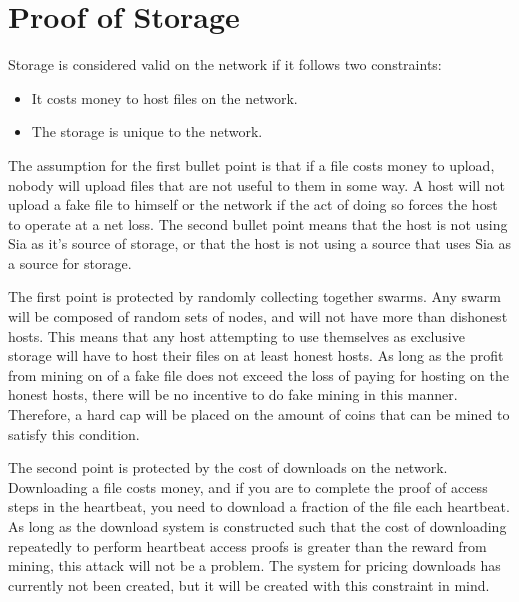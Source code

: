 \documentclass[twocolumn]{article}
\begin{document}
\section{Proof of Storage}

Storage is considered valid on the network if it follows two constraints:

\begin{itemize}
	\item It costs money to host files on the network.
	\item The storage is unique to the network.
\end{itemize}

The assumption for the first bullet point is that if a file costs money to upload, nobody will upload files that are not useful to them in some way.
A host will not upload a fake file to himself or the network if the act of doing so forces the host to operate at a net loss.
The second bullet point means that the host is not using Sia as it's source of storage, or that the host is not using a source that uses Sia as a source for storage.

The first point is protected by randomly collecting together swarms.
Any swarm will be composed of random sets of nodes, and will not have more than \maxcorruption \space dishonest hosts.
This means that any host attempting to use themselves as exclusive storage will have to host their files on at least \inversemaxcorruption \space honest hosts.
As long as the profit from mining on \maxcorruption \space of a fake file does not exceed the loss of paying for hosting on the \inversemaxcorruption honest hosts, there will be no incentive to do fake mining in this manner.
Therefore, a hard cap will be placed on the amount of coins that can be mined to satisfy this condition.

The second point is protected by the cost of downloads on the network.
Downloading a file costs money, and if you are to complete the proof of access steps in the heartbeat, you need to download a fraction of the file each heartbeat.
As long as the download system is constructed such that the cost of downloading repeatedly to perform heartbeat access proofs is greater than the reward from mining, this attack will not be a problem.
The system for pricing downloads has currently not been created, but it will be created with this constraint in mind.

\end{document}
